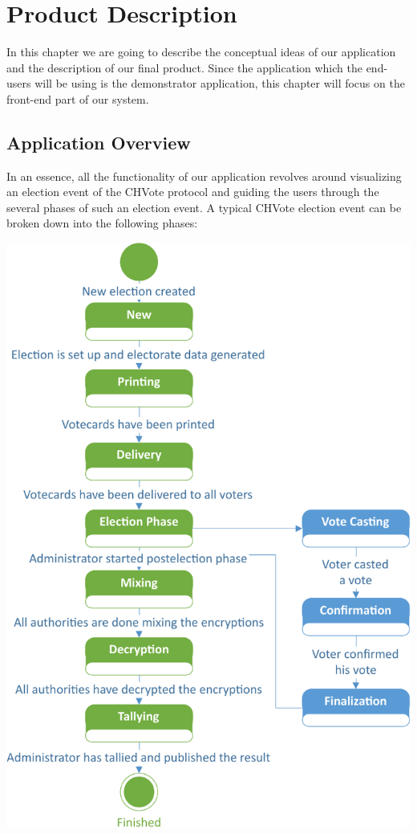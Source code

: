 \chapter{Product Description}
In this chapter we are going to describe the conceptual ideas of our application and the description of our final product. Since the application which the end-users will be using is the demonstrator application, this chapter will focus on the front-end part of our system.

\section{Application Overview}
In an essence, all the functionality of our application revolves around visualizing an election event of the CHVote protocol and guiding the users through the several phases of such an election event. A typical CHVote election event can be broken down into the following phases:

\begin{center}
\includegraphics[scale=0.65]{assets/electionStatediagram.pdf}
\label{Phases of an election-event}%
\end{center}

